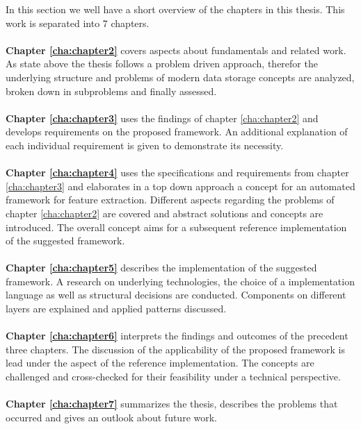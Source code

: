 In this section we well have a short overview of the chapters in this thesis. This work is separated into 7 chapters.
\\\\
\textbf{Chapter \ref{cha:chapter2}} covers aspects about fundamentals and related work. As state above the thesis follows a problem driven approach, therefor the underlying structure and problems of modern data storage concepts are analyzed, broken down in subproblems and finally assessed.
\\\\
\textbf{Chapter \ref{cha:chapter3}} uses the findings of chapter \ref{cha:chapter2} and develops requirements on the proposed framework. An additional explanation of each individual requirement is given to demonstrate its necessity.
\\\\
\textbf{Chapter \ref{cha:chapter4}} uses the specifications and requirements from chapter \ref{cha:chapter3} and elaborates in a top down approach a concept for an automated framework for feature extraction. Different aspects regarding the problems of chapter \ref{cha:chapter2} are covered and abstract solutions and concepts are introduced. The overall concept aims for a subsequent reference implementation of the suggested framework.
\\\\
\textbf{Chapter \ref{cha:chapter5}} describes the implementation of the suggested framework. A research on underlying technologies, the choice of a implementation language as well as structural decisions are conducted. Components on different layers are explained and applied patterns discussed. 
\\\\
\textbf{Chapter \ref{cha:chapter6}} interprets the findings and outcomes of the precedent three chapters. The discussion of the applicability of the proposed framework is lead under the aspect of the reference implementation. The concepts are challenged and cross-checked for their feasibility under a technical perspective.
\\\\
\textbf{Chapter \ref{cha:chapter7}} summarizes the thesis, describes the problems that occurred and gives an outlook about future work.